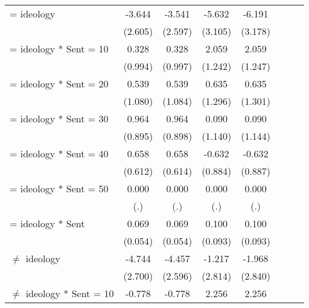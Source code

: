 \begin{table}[H]
{\begin{threeparttable}
\begin{tabular}{lccccccc}
\addlinespace
= ideology          &      -3.644         &      -3.541         &      -5.632\sym{*}  &      -6.191\sym{*}  \\
                    &     (2.605)         &     (2.597)         &     (3.105)         &     (3.178)         \\
\addlinespace
= ideology * Sent = 10&       0.328         &       0.328         &       2.059\sym{*}  &       2.059         \\
                    &     (0.994)         &     (0.997)         &     (1.242)         &     (1.247)         \\
\addlinespace
= ideology * Sent = 20&       0.539         &       0.539         &       0.635         &       0.635         \\
                    &     (1.080)         &     (1.084)         &     (1.296)         &     (1.301)         \\
\addlinespace
= ideology * Sent = 30&       0.964         &       0.964         &       0.090         &       0.090         \\
                    &     (0.895)         &     (0.898)         &     (1.140)         &     (1.144)         \\
\addlinespace
= ideology * Sent = 40&       0.658         &       0.658         &      -0.632         &      -0.632         \\
                    &     (0.612)         &     (0.614)         &     (0.884)         &     (0.887)         \\
\addlinespace
= ideology * Sent = 50&       0.000         &       0.000         &       0.000         &       0.000         \\
                    &         (.)         &         (.)         &         (.)         &         (.)         \\
\addlinespace
= ideology * Sent   &       0.069         &       0.069         &       0.100         &       0.100         \\
                    &     (0.054)         &     (0.054)         &     (0.093)         &     (0.093)         \\
\addlinespace
$\neq$ ideology     &      -4.744\sym{*}  &      -4.457\sym{*}  &      -1.217         &      -1.968         \\
                    &     (2.700)         &     (2.596)         &     (2.814)         &     (2.840)         \\
\addlinespace
$\neq$ ideology * Sent = 10&      -0.778         &      -0.778         &       2.256         &       2.256         \\

\end{tabular}
\end{threeparttable}}
\end{table}
